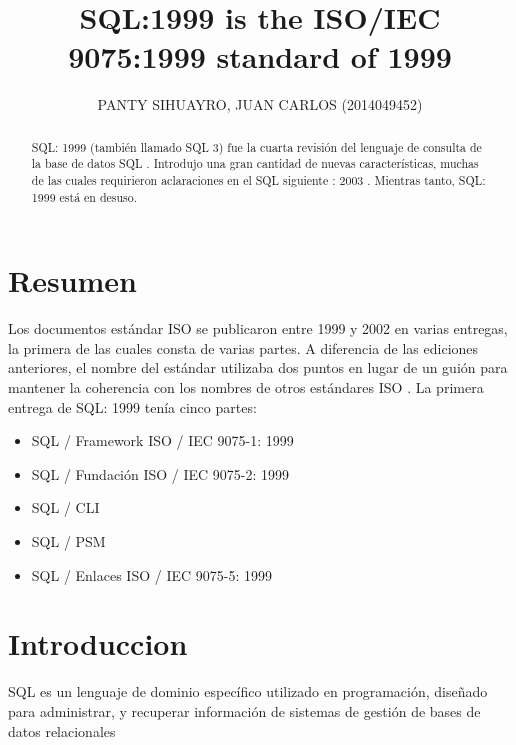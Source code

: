 \documentclass[preprint,12pt]{elsarticle}
\begin{document}
	
	\begin{frontmatter}

		\title{\huge SQL:1999 is the ISO/IEC 9075:1999 standard of 1999}
		
		\author{PANTY SIHUAYRO, JUAN CARLOS   (2014049452)}
	
		\address{Tacna, Perú}
		
		\begin{abstract}
SQL: 1999 (también llamado SQL 3) fue la cuarta revisión del lenguaje de consulta de la base de datos SQL . Introdujo una gran cantidad de nuevas características, muchas de las cuales requirieron aclaraciones en el SQL siguiente : 2003 . Mientras tanto, SQL: 1999 está en desuso.
		\end{abstract}
\end{frontmatter}
	
	\section{Resumen}
Los documentos estándar ISO se publicaron entre 1999 y 2002 en varias entregas, la primera de las cuales consta de varias partes. A diferencia de las ediciones anteriores, el nombre del estándar utilizaba dos puntos en lugar de un guión para mantener la coherencia con los nombres de otros estándares ISO . La primera entrega de SQL: 1999 tenía cinco partes:

\begin{itemize}
		\item SQL / Framework ISO / IEC 9075-1: 1999
		\item SQL / Fundación ISO / IEC 9075-2: 1999 
		\item SQL / CLI
		\item SQL / PSM
		\item SQL / Enlaces ISO / IEC 9075-5: 1999

	\end{itemize}
	
\section{Introduccion}
SQL es un lenguaje de dominio específico utilizado en programación, diseñado para administrar, y recuperar información de sistemas de gestión de bases de datos relacionales

	
\end{document}
